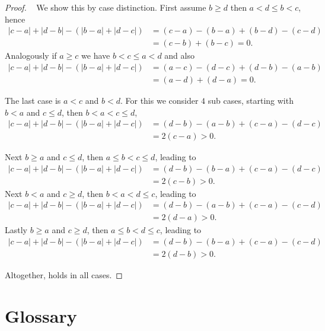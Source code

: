 \documentclass{article}
\theoremstyle{definition}
\begin{document}
\begin{proof} ~
We show this by case distinction. First assume $b \geq d$ then $a < d  \leq b < c$, hence
\begin{align*}
    |c-a| + |d-b| - (|b-a| + |d-c|) &= (c-a) - (b-a) + (b-d) - (c-d) \\
    &= (c-b) + (b-c)= 0.
\end{align*}
Analogously if  $a \geq c$ we have $b < c \leq a < d$ and also
\begin{align*}
    |c-a| + |d-b| - (|b-a| + |d-c|) &= (a-c) - (d-c) + (d-b) - (a-b) \\
    &= (a-d) + (d-a) = 0.
\end{align*}

The last case is $a < c$ and $b < d$. For this we consider $4$ sub cases, starting with $b < a$ and $c\leq d$, then $b< a < c\leq d$,
\begin{align*}
    |c-a| + |d-b| - (|b-a| + |d-c|) &=  (d-b)-(a-b) +  (c-a)  - (d-c) \\
    &= 2(c-a) > 0.
\end{align*}

Next $b \geq a$ and $c\leq d$, then $a \leq b < c \leq d$, leading to
\begin{align*}
    |c-a| + |d-b| - (|b-a| + |d-c|) &=  (d-b)-(b-a) +  (c-a)  - (d-c) \\
    &= 2(c-b) > 0.
\end{align*}
Next $b < a$ and $c\geq d$, then $b < a < d \leq c$, leading to
\begin{align*}
    |c-a| + |d-b| - (|b-a| + |d-c|) &=  (d-b)-(a-b) +  (c-a)  - (c-d) \\
    &= 2(d-a) > 0.
\end{align*}
Lastly $b \geq a$ and $c\geq d$, then $a \leq b < d \leq c$, leading to
\begin{align*}
    |c-a| + |d-b| - (|b-a| + |d-c|) &=  (d-b)-(b-a) +  (c-a)  - (c-d) \\
    &= 2(d-b) > 0.
\end{align*}

Altogether,  holds in all cases.
\end{proof}

\section*{Glossary} \label{sec:glossary}
\end{document}
